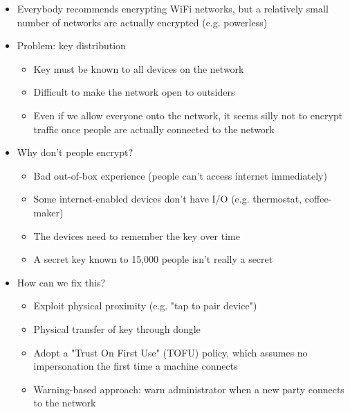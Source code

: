 \begin{itemize}
    \item Everybody recommends encrypting WiFi networks, but a relatively small number of networks are actually encrypted (e.g. powerless)
    \item Problem: key distribution
    	\begin{itemize}
		\item Key must be known to all devices on the network
		\item Difficult to make the network open to outsiders
		\item Even if we allow everyone onto the network, it seems silly not to encrypt traffic once people are actually connected to the network
	\end{itemize}
    \item Why don't people encrypt?
       	\begin{itemize}
		\item Bad out-of-box experience (people can't access internet immediately)
		\item Some internet-enabled devices don't have I/O (e.g. thermostat, coffee-maker)
		\item The devices need to remember the key over time
		\item A secret key known to 15,000 people isn't really a secret
	\end{itemize}
   \item How can we fix this?
         \begin{itemize}
		\item Exploit physical proximity (e.g. "tap to pair device")
		\item Physical transfer of key through dongle
		\item Adopt a "Trust On First Use" (TOFU) policy, which assumes no impersonation the first time a machine connects
		\item Warning-based approach: warn administrator when a new party connects to the network
	\end{itemize}
\end{itemize}

